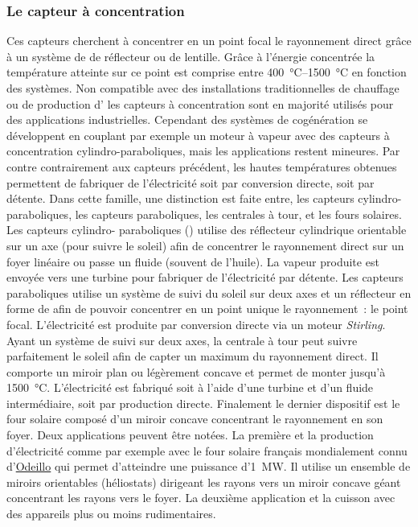 \subsubsection{Le capteur à concentration} %
\label{ssub:le_capteur_a_concentration}
Ces capteurs cherchent à concentrer en un point focal le rayonnement direct grâce à un
système de de réflecteur ou de lentille. Grâce à l’énergie concentrée la température
atteinte sur ce point est comprise entre \SIrange{400}{1500}{\celsius} en fonction des
systèmes. Non compatible avec des installations traditionnelles de chauffage ou de production
d’ les capteurs à concentration sont en majorité utilisés pour des applications
industrielles. Cependant des systèmes de cogénération se développent en couplant
par exemple un moteur à vapeur avec des capteurs à concentration cylindro-paraboliques,
mais les applications restent mineures.
Par contre contrairement aux capteurs précédent, les hautes températures obtenues
permettent de fabriquer de l’électricité soit par conversion directe, soit par détente.
Dans cette famille, une distinction est faite entre, les capteurs cylindro-paraboliques, les capteurs
paraboliques, les centrales à tour, et les fours solaires. Les capteurs cylindro-
paraboliques () utilise des réflecteur
cylindrique orientable sur un axe (pour suivre le soleil) afin de concentrer le
rayonnement direct sur un foyer linéaire ou passe un fluide (souvent de l’huile). La
vapeur produite est envoyée vers une turbine pour fabriquer de l’électricité par détente.
Les capteurs paraboliques utilise un système de suivi du soleil sur deux axes et un
réflecteur en forme de  afin de pouvoir concentrer en un point unique le rayonnement~: le point focal.
L’électricité est produite par conversion directe via un moteur \textit{Stirling}. Ayant un
système de suivi sur deux axes, la centrale à tour peut suivre parfaitement le soleil afin
de capter un maximum du rayonnement direct. Il comporte un miroir plan ou légèrement
concave et permet de monter jusqu’à \SI{1500}{\celsius}. L’électricité est fabriqué soit à
l’aide d’une turbine et d’un fluide intermédiaire, soit par production directe. Finalement
le dernier dispositif est le four solaire composé d’un miroir concave concentrant le
rayonnement en son foyer. Deux applications peuvent être notées. La première et la
production d’électricité comme par exemple avec le four solaire français mondialement
connu d’\href{http://www.promes.cnrs.fr/index.php?page=historique}{Odeillo} qui permet
d’atteindre une puissance d’\SI{1}{\mega\watt}. Il utilise un ensemble de miroirs
orientables (héliostats) dirigeant les rayons vers un miroir concave géant concentrant les
rayons vers le foyer. La deuxième application et la cuisson avec des appareils plus ou
moins rudimentaires.


